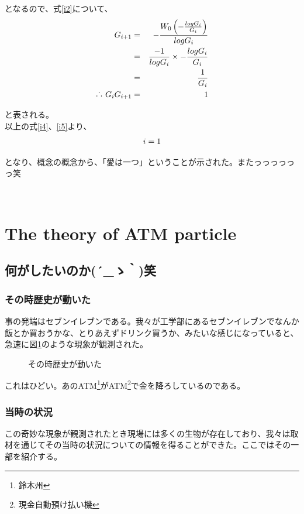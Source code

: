 \documentclass[12pt]{jsarticle}
\begin{document}
となるので、式\ref{i2}について、
\begin{eqnarray}
G_{i+1}&=&-\frac{W_{0}\left( -\frac{logG_{i}}{G_{i}}\right)}{logG_{i}} \nonumber\\
&=&\frac{-1}{logG_{i}}\times -\frac{logG_{i}}{G_{i}}\nonumber\\
&=&\frac{1}{G_{i}} \nonumber\\
\raisebox{.2ex}{.}\raisebox{1.2ex}{.}\raisebox{.2ex}{.} \ G_{i}G_{i+1} &=& 1
\label{i5}
 \end{eqnarray}

と表される。\\
以上の式\ref{i4}、\ref{i5}より、
\begin{eqnarray}
\Large{i=1}
 \end{eqnarray}

となり、概念の概念から、「愛は一つ」ということが示された。またっっっっっっ笑


\
\newpage
\section{The theory of ATM particle}

\subsection{何がしたいのか{\sf (´\_ゝ｀)}笑}
\subsubsection{その時歴史が動いた}
事の発端はセブンイレブンである。我々が工学部にあるセブンイレブンでなんか飯とか買おうかな、とりあえずドリンク買うか、みたいな感じになっていると、急速に図\ref{ATMATM}のような現象が観測された。

\begin{figure}[H]
\centering
    \caption{その時歴史が動いた}
    \label{ATMATM}
\end{figure}

これはひどい。あのATM\footnote{鈴木州}がATM\footnote{現金自動預け払い機}で金を降ろしているのである。

\subsubsection{当時の状況}
この奇妙な現象が観測されたとき現場には多くの生物が存在しており、我々は取材を通じてその当時の状況についての情報を得ることができた。ここではその一部を紹介する。\\
\end{document}
